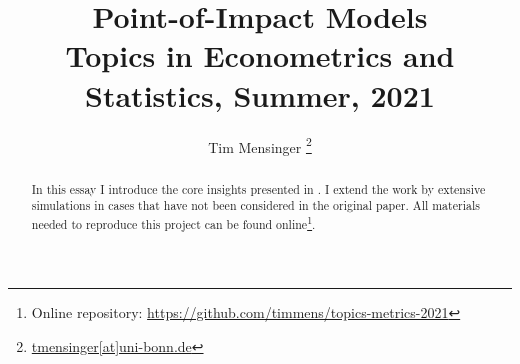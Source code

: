 \documentclass[a4paper, 12pt]{article}
\title{\textbf{Point-of-Impact Models}\\
\large Topics in Econometrics and Statistics, Summer, 2021
}
\date{}
\author{Tim Mensinger%
  \thanks{\href{mailto:tmensinger@uni-bonn.de}{tmensinger[at]uni-bonn.de}}}
\affil{University of Bonn}
\begin{document}
\onehalfspacing


\setlength{\abovedisplayskip}{-20pt}
\setlength{\belowdisplayskip}{0pt}
\setlength{\abovedisplayshortskip}{0pt}
\setlength{\belowdisplayshortskip}{0pt}


\thispagestyle{empty}
\maketitle
\begin{abstract}
    In this essay I introduce the core insights presented in \cite{Kneip2020}. I extend
    the work by extensive simulations in cases that have not been considered in the
    original paper. All materials needed to reproduce this project can be found
    online\footnote{Online repository:
    \url{https://github.com/timmens/topics-metrics-2021}}.
\end{abstract}


\newpage
\setcounter{tocdepth}{2}
\tableofcontents
\newpage





\pagestyle{plain}

\newpage
\nocite{*}
\printbibliography

\appendix
\end{document}
